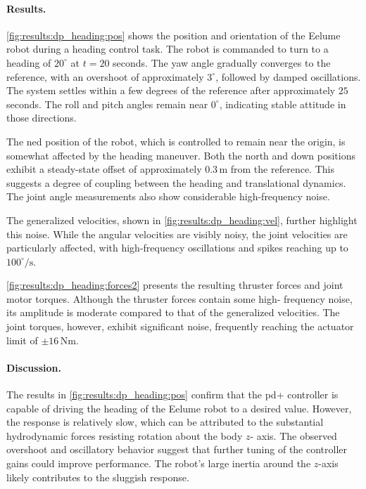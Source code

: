 \paragraph{Results.}
\autoref{fig:results:dp_heading:pos} shows the position and orientation of the 
Eelume robot during a heading control task. The robot is commanded to turn to 
a heading of \(20^\circ\) at \(t = 20\) seconds. The yaw angle gradually 
converges to the reference, with an overshoot of approximately \(3^\circ\), 
followed by damped oscillations. The system settles within a few degrees of 
the reference after approximately \(25\) seconds. The roll and pitch angles 
remain near \(0^\circ\), indicating stable attitude in those directions.

The \gls{ned} position of the robot, which is controlled to remain near the 
origin, is somewhat affected by the heading maneuver. Both the north and down 
positions exhibit a steady-state offset of approximately \(0.3\,\mathrm{m}\) 
from the reference. This suggests a degree of coupling between the heading and 
translational dynamics. The joint angle measurements also show considerable 
high-frequency noise.

The generalized velocities, shown in \autoref{fig:results:dp_heading:vel}, 
further highlight this noise. While the angular velocities are visibly noisy, 
the joint velocities are particularly affected, with high-frequency 
oscillations and spikes reaching up to \(100^\circ/\mathrm{s}\).

\autoref{fig:results:dp_heading:forces2} presents the resulting thruster 
forces and joint motor torques. Although the thruster forces contain some high-
frequency noise, its amplitude is moderate compared to that of the generalized 
velocities. The joint torques, however, exhibit significant noise, frequently 
reaching the actuator limit of \(\pm16\,\mathrm{Nm}\).

\paragraph{Discussion.}

The results in \autoref{fig:results:dp_heading:pos} confirm that the \gls{pd+} 
controller is capable of driving the heading of the Eelume robot to a desired 
value. However, the response is relatively slow, which can be attributed to 
the substantial hydrodynamic forces resisting rotation about the body \(z\)-
axis. The observed overshoot and oscillatory behavior suggest that further 
tuning of the controller gains could improve performance. The robot's large 
inertia around the \(z\)-axis likely contributes to the sluggish response.


